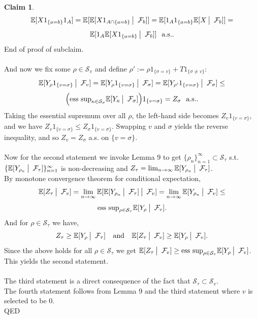 \documentclass[12pt]{article}
\newcommand{\cF}{\mathcal{F}}
\newcommand{\cS}{\mathcal{S}}
\newcommand{\E}{\mathbb{E}}
\newcommand{\quantifyspace}{\hspace{2px} \big | \hspace{5px}}
\newcommand{\spc}{\hspace{7 px}}
\newcommand{\ind}[1]{1_{\{#1\}}}
\newcommand{\als}{\text{a.s.}}
\newcommand{\esssup}{\text{ess sup}}
\newcommand{\QED}{\hspace*{\fill}\textup{QED}}
\theoremstyle{definition}
\newtheorem{claim}{Claim}
\begin{document}
\begin{claim}
    \[
        \E[X \ind{a = b} 1_A] =
        \E[\E[X 1_{A \cap \{a = b\}} \quantifyspace \cF_b]] =
        \E[1_A \ind{a = b} \E[X \quantifyspace \cF_b]] =
    \]
    \[
        \E[1_A \E[X \ind{a = b} \quantifyspace \cF_b]] \spc \als.
    \]
    End of proof of subclaim. \\
    \\
    And now we fix some $\rho \in \cS_v$ and define $\rho' := \rho \ind{\sigma = v} + T \ind{\sigma \neq v}$:
    \[
        \E[Y_\rho \ind{v = \sigma} \quantifyspace \cF_v] =
        \E[Y_\rho \ind{v = \sigma} \quantifyspace \cF_\sigma] =
        \E[Y_{\rho'} \ind{v = \sigma} \quantifyspace \cF_\sigma] \leq
    \]
    \[
        \Big ( \esssup_{\kappa \in \cS_\sigma} \E[Y_\kappa \quantifyspace \cF_\sigma] \Big ) \ind{v = \sigma} = Z_\sigma \spc \als.
    \]
    Taking the essential supremum over all $\rho$, the left-hand side becomes $Z_v \ind{v = \sigma}$, and we have $Z_v \ind{v = \sigma} \leq Z_\sigma \ind{v = \sigma}$.
    Swapping $v$ and $\sigma$ yields the reverse inequality, and so $Z_v = Z_\sigma$ a.s. on $\{v = \sigma\}$. \\
    \\
    Now for the second statement we invoke Lemma 9 to get $\{\rho_n\}_{n=1}^\infty \subset \cS_\tau$ s.t. $\{\E[Y_{\rho_n} \quantifyspace \cF_\tau]\}_{n=1}^\infty$ is non-decreasing and $Z_\tau = \lim_{n \to \infty} \E[Y_{\rho_n} \quantifyspace \cF_\tau]$. \\
    By monotone convergence theorem for conditional expectation,
    \[
        \E[Z_\tau \quantifyspace \cF_v] = \lim_{n \to \infty} \E[ \E[Y_{\rho_n} \quantifyspace \cF_\tau] \quantifyspace \cF_v] = 
        \lim_{n \to \infty} \E[ Y_{\rho_n} \quantifyspace \cF_v ] \leq
    \]
    \[
        \esssup_{\rho \in \cS_\tau} \E[Y_\rho \quantifyspace \cF_v].
    \]
    And for $\rho \in \cS_\tau$ we have,
    \[
        Z_\tau \geq \E[Y_\rho \quantifyspace \cF_\tau] \spc \text{ and }\spc
        \E[ Z_\tau \quantifyspace \cF_v] \geq \E[Y_\rho \quantifyspace \cF_v].
    \]
    Since the above holds for all $\rho \in \cS_\tau$ we get $\E[Z_\tau \quantifyspace \cF_v] \geq \esssup_{\rho \in \cS_\tau} \E[Y_\rho \quantifyspace \cF_v]$. \\
    This yields the second statement. \\
    \\
    The third statement is a direct consequence of the fact that $\cS_\tau \subset \cS_v$. \\
    The fourth statement follows from Lemma 9 and the third statement where $v$ is selected to be 0. \\
    \QED
\end{claim}
\end{document}
